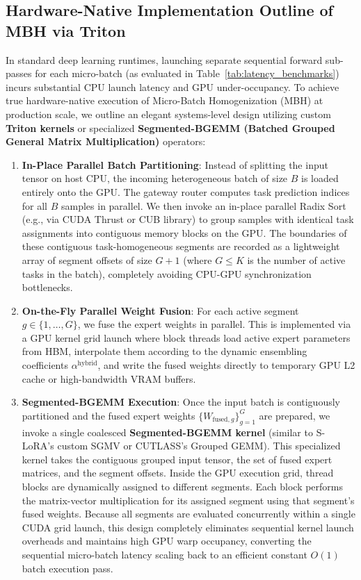 \documentclass{article}
\theoremstyle{plain}
\theoremstyle{definition}
\theoremstyle{remark}
\begin{document}
\subsection{Hardware-Native Implementation Outline of MBH via Triton}
In standard deep learning runtimes, launching separate sequential forward sub-passes for each micro-batch (as evaluated in Table~\ref{tab:latency_benchmarks}) incurs substantial CPU launch latency and GPU under-occupancy. To achieve true hardware-native execution of Micro-Batch Homogenization (MBH) at production scale, we outline an elegant systems-level design utilizing custom \textbf{Triton kernels} or specialized \textbf{Segmented-BGEMM (Batched Grouped General Matrix Multiplication)} operators:
\begin{enumerate}
    \item \textbf{In-Place Parallel Batch Partitioning}: Instead of splitting the input tensor on host CPU, the incoming heterogeneous batch of size $B$ is loaded entirely onto the GPU. The gateway router computes task prediction indices for all $B$ samples in parallel. We then invoke an in-place parallel Radix Sort (e.g., via CUDA Thrust or CUB library) to group samples with identical task assignments into contiguous memory blocks on the GPU. The boundaries of these contiguous task-homogeneous segments are recorded as a lightweight array of segment offsets of size $G+1$ (where $G \le K$ is the number of active tasks in the batch), completely avoiding CPU-GPU synchronization bottlenecks.
    \item \textbf{On-the-Fly Parallel Weight Fusion}: For each active segment $g \in \{1, \dots, G\}$, we fuse the expert weights in parallel. This is implemented via a GPU kernel grid launch where block threads load active expert parameters from HBM, interpolate them according to the dynamic ensembling coefficients $\alpha^{\text{hybrid}}$, and write the fused weights directly to temporary GPU L2 cache or high-bandwidth VRAM buffers.
    \item \textbf{Segmented-BGEMM Execution}: Once the input batch is contiguously partitioned and the fused expert weights $\{W_{\text{fused}, g}\}_{g=1}^G$ are prepared, we invoke a single coalesced \textbf{Segmented-BGEMM kernel} (similar to S-LoRA's custom SGMV or CUTLASS's Grouped GEMM). This specialized kernel takes the contiguous grouped input tensor, the set of fused expert matrices, and the segment offsets. Inside the GPU execution grid, thread blocks are dynamically assigned to different segments. Each block performs the matrix-vector multiplication for its assigned segment using that segment's fused weights. Because all segments are evaluated concurrently within a single CUDA grid launch, this design completely eliminates sequential kernel launch overheads and maintains high GPU warp occupancy, converting the sequential micro-batch latency scaling back to an efficient constant $O(1)$ batch execution pass.

\end{enumerate}
\end{document}
